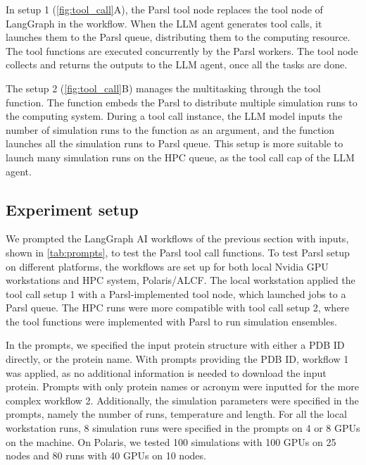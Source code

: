 In setup  1 (\autoref{fig:tool_call}A), the Parsl tool node replaces the tool node of LangGraph in the workflow. 
When the LLM agent generates tool calls, it launches them to the Parsl queue, distributing them to the computing resource. 
The tool functions are executed concurrently by the Parsl workers. 
The tool node collects and returns the outputs to the LLM agent, once all the tasks are done. 

The setup 2 (\autoref{fig:tool_call}B) manages the multitasking through the tool function. 
The function embeds the Parsl to distribute multiple simulation runs to the computing system. 
During a tool call instance, the LLM model inputs the number of simulation runs to the function as an argument, and the function launches all the simulation runs to Parsl queue. 
This setup is more suitable to launch many simulation runs on the HPC queue, as the tool call cap of the LLM agent. 



\subsection{Experiment setup}
We prompted the LangGraph AI workflows of the previous section with inputs, shown in \autoref{tab:prompts}, to test the Parsl tool call functions. 
To test Parsl setup on different platforms, the workflows are set up for both local Nvidia GPU workstations and HPC system, Polaris/ALCF. 
The local workstation applied the tool call setup 1 with a Parsl-implemented tool node, which launched jobs to a Parsl queue. 
The HPC runs were more compatible with tool call setup 2, where the tool functions were implemented with Parsl to run simulation ensembles. 


In the prompts, we specified the input protein structure with either a PDB ID directly, or the protein name. 
With prompts providing the PDB ID, workflow 1 was applied, as no additional information is needed to download the input protein.
Prompts with only protein names or acronym were inputted for the more complex workflow 2. 
Additionally, the simulation parameters were specified in the prompts, namely the number of runs, temperature and length. 
For all the local workstation runs, 8 simulation runs were specified in the prompts on 4 or 8 GPUs on the machine. 
On Polaris, we tested 100 simulations with 100 GPUs on 25 nodes and 80 runs with 40 GPUs on 10 nodes. 



